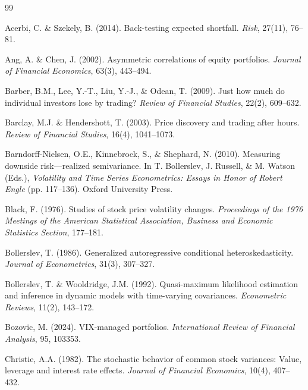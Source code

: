 \documentclass[12pt,a4paper]{article}
\begin{document}

\begin{thebibliography}{99}

Acerbi, C. \& Szekely, B. (2014). Back-testing expected shortfall. \textit{Risk}, 27(11), 76--81.

Ang, A. \& Chen, J. (2002). Asymmetric correlations of equity portfolios. \textit{Journal of Financial Economics}, 63(3), 443--494.

Barber, B.M., Lee, Y.-T., Liu, Y.-J., \& Odean, T. (2009). Just how much do individual investors lose by trading? \textit{Review of Financial Studies}, 22(2), 609--632.

Barclay, M.J. \& Hendershott, T. (2003). Price discovery and trading after hours. \textit{Review of Financial Studies}, 16(4), 1041--1073.

Barndorff-Nielsen, O.E., Kinnebrock, S., \& Shephard, N. (2010). Measuring downside risk---realized semivariance. In T. Bollerslev, J. Russell, \& M. Watson (Eds.), \textit{Volatility and Time Series Econometrics: Essays in Honor of Robert Engle} (pp. 117--136). Oxford University Press.

Black, F. (1976). Studies of stock price volatility changes. \textit{Proceedings of the 1976 Meetings of the American Statistical Association, Business and Economic Statistics Section}, 177--181.

Bollerslev, T. (1986). Generalized autoregressive conditional heteroskedasticity. \textit{Journal of Econometrics}, 31(3), 307--327.

Bollerslev, T. \& Wooldridge, J.M. (1992). Quasi-maximum likelihood estimation and inference in dynamic models with time-varying covariances. \textit{Econometric Reviews}, 11(2), 143--172.

Bozovic, M. (2024). VIX-managed portfolios. \textit{International Review of Financial Analysis}, 95, 103353.

Christie, A.A. (1982). The stochastic behavior of common stock variances: Value, leverage and interest rate effects. \textit{Journal of Financial Economics}, 10(4), 407--432.


\end{thebibliography}
\end{document}
